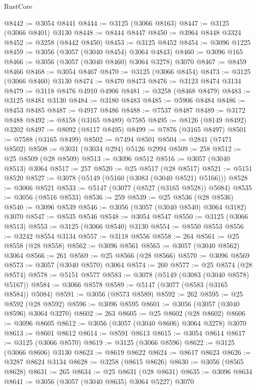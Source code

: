 \begin{lexlean}{RustCore}
\begin{coremodule}
@8442 := @3054 @8441
@8444 := @3125 (@3066 @8163)
@8447 := @3125 (@3066 @8401) @3130
@8448 := @8444 @8447
@8450 := @3964 @8448 @3324
@8452 := @3258 (@8442 @8450)
@8453 := @3125 @8452
@8454 := @3096 @1225
@8459 := @3056 (@3057 (@3040 @8454) @3064 @4843)
@8460 := @3096 @165
@8466 := @3056 (@3057 (@3040 @8460) @3064 @3278) @3070
@8467 := @8459 @8466
@8468 := @3054 @8467
@8470 := @3125 (@3066 @8454)
@8473 := @3125 (@3066 @8460) @3130
@8474 := @8470 @8473
@8476 := @3123 @8474 @3134
@8479 := @3118 @8476 @4910 @4906
@8481 := @3258 (@8468 @8479)
@8483 := @3125 @8481 @3130
@8484 := @3180 @8483
@8485 := @5906 @8484
@8486 := @8453 @8485
@8487 := @4917 @8486
@8488 := @7537 @8487
@8489 := @3172 @8488
@8492 := @8158 (@3165 @8489) @7585
@8495 := @8126 (@8149 @8492) @3202
@8497 := @8092 (@8117 @8495)
@8499 := @7876 (@3165 @8497)
@8501 := @7588 (@3165 @8499)
@8502 := @7494 @8501
@8504 := @2841 (@7471 @8502)
@8508 := @3031 (@3034 @294) @5126 @2994
@8509 := 258
@8512 := @25 @8509 (@28 @8509)
@8513 := @3096 @8512
@8516 := @3057 (@3040 @8513) @3064
@8517 := 257
@8520 := @25 @8517 (@28 @8517)
@8521 := @5151 @8520
@8527 := @3078 (@5149 (@5160 (@3083 (@3040 @8521) @5166)))
@8528 := @3066 @8521
@8533 := @5147 (@3077 (@8527 (@3165 @8528)) @5084)
@8535 := @3056 (@8516 @8533)
@8536 := 259
@8539 := @25 @8536 (@28 @8536)
@8540 := @3096 @8539
@8546 := @3056 (@3057 (@3040 @8540) @3064 @3182) @3070
@8547 := @8535 @8546
@8548 := @3054 @8547
@8550 := @3125 (@3066 @8513)
@8553 := @3125 (@3066 @8540) @3130
@8554 := @8550 @8553
@8556 := @3242 @8554 @3134
@8557 := @3118 @8556
@8558 := 264
@8561 := @25 @8558 (@28 @8558)
@8562 := @3096 @8561
@8565 := @3057 (@3040 @8562) @3064
@8566 := 261
@8569 := @25 @8566 (@28 @8566)
@8570 := @3096 @8569
@8573 := @3057 (@3040 @8570) @3064
@8574 := 260
@8577 := @25 @8574 (@28 @8574)
@8578 := @5151 @8577
@8583 := @3078 (@5149 (@3083 (@3040 @8578) @5167))
@8584 := @3066 @8578
@8589 := @5147 (@3077 (@8583 (@3165 @8584)) @5084)
@8591 := @3056 (@8573 @8589)
@8592 := 262
@8595 := @25 @8592 (@28 @8592)
@8596 := @3096 @8595
@8601 := @3056 (@3057 (@3040 @8596) @3064 @3270)
@8602 := 263
@8605 := @25 @8602 (@28 @8602)
@8606 := @3096 @8605
@8612 := @3056 (@3057 (@3040 @8606) @3064 @3278) @3070
@8613 := @8601 @8612
@8614 := @8591 @8613
@8615 := @3054 @8614
@8617 := @3125 (@3066 @8570)
@8619 := @3125 (@3066 @8596)
@8622 := @3125 (@3066 @8606) @3130
@8623 := @8619 @8622
@8624 := @8617 @8623
@8626 := @3287 @8624 @3134
@8628 := @3258 (@8615 @8626)
@8630 := @3056 (@8565 @8628)
@8631 := 265
@8634 := @25 @8631 (@28 @8631)
@8635 := @3096 @8634
@8641 := @3056 (@3057 (@3040 @8635) @3064 @5227) @3070

\end{coremodule}
\end{lexlean}
